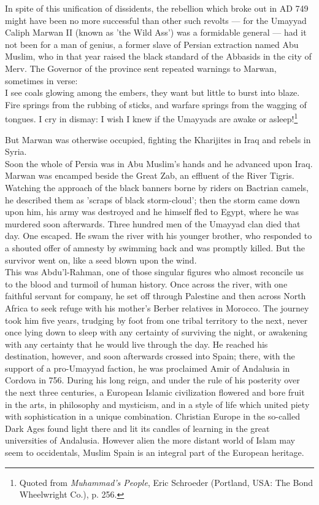 \documentclass[11pt, b5paper, twoside]{book}
\begin{document}
In spite of this unification of dissidents, the rebellion which broke out in AD 749 might have been 
no more successful than other such revolts --- for the Umayyad Caliph Marwan II (known as 'the Wild 
Ass') was a formidable general --- had it not been for a man of genius, a former slave of Persian 
extraction named Abu Muslim, who in that year raised the black standard of the Abbasids in the city 
of Merv. The Governor of the province sent repeated warnings to Marwan, sometimes in verse: \\

I see coals glowing among the embers, they want but little to burst into blaze. Fire springs from the 
rubbing of sticks, and warfare springs from the wagging of tongues. I cry in dismay: I wish I knew if 
the Umayyads are awake or asleep!\footnote{Quoted from \emph{Muhammad's People}, Eric Schroeder (Portland, USA: The Bond Wheelwright Co.), p. 256.}

But Marwan was otherwise occupied, fighting the Kharijites in Iraq and rebels in Syria. \\

Soon the whole of Persia was in Abu Muslim's hands and he advanced upon Iraq. Marwan was encamped 
beside the Great Zab, an effluent of the River Tigris. Watching the approach of the black banners 
borne by riders on Bactrian camels, he described them as 'scraps of black storm-cloud'; then the 
storm came down upon him, his army was destroyed and he himself fled to Egypt, where he was murdered 
soon afterwards. Three hundred men of the Umayyad clan died that day. One escaped. He swam the river 
with his younger brother, who responded to a shouted offer of amnesty by swimming back and was 
promptly killed. But the survivor went on, like a seed blown upon the wind.\\

This was Abdu'l-Rahman, one of those singular figures who almost reconcile us to the blood and 
turmoil of human history. Once across the river, with one faithful servant for company, he set off 
through Palestine and then across North Africa to seek refuge with his mother's Berber relatives in 
Morocco. The journey took him five years, trudging by foot from one tribal territory to the next, 
never once lying down to sleep with any certainty of surviving the night, or awakening with any 
certainty that he would live through the day. He reached his destination, however, and soon 
afterwards crossed into Spain; there, with the support of a pro-Umayyad faction, he was proclaimed 
Amir of Andalusia in Cordova in 756. During his long reign, and under the rule of his posterity over 
the next three centuries, a European Islamic civilization flowered and bore fruit in the arts, in 
philosophy and mysticism, and in a style of life which united piety with sophistication in a unique 
combination. Christian Europe in the so-called Dark Ages found light there and lit its candles of 
learning in the great universities of Andalusia. However alien the more distant world of Islam may 
seem to occidentals, Muslim Spain is an integral part of the European heritage. \\
\end{document}
